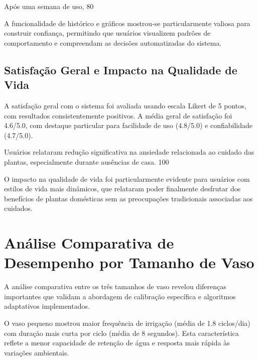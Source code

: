 \documentclass[twoside,english,brazilian]{UNISINOSmonografia}
\begin{document}
Após uma semana de uso, 80%

A funcionalidade de histórico e gráficos mostrou-se particularmente valiosa para construir confiança, permitindo que usuários visualizem padrões de comportamento e compreendam as decisões automatizadas do sistema.


\subsection{Satisfação Geral e Impacto na Qualidade de Vida}

A satisfação geral com o sistema foi avaliada usando escala Likert de 5 pontos, com resultados consistentemente positivos. A média geral de satisfação foi 4.6/5.0, com destaque particular para facilidade de uso (4.8/5.0) e confiabilidade (4.7/5.0).

Usuários relataram redução significativa na ansiedade relacionada ao cuidado das plantas, especialmente durante ausências de casa. 100%

O impacto na qualidade de vida foi particularmente evidente para usuários com estilos de vida mais dinâmicos, que relataram poder finalmente desfrutar dos benefícios de plantas domésticas sem as preocupações tradicionais associadas aos cuidados.

\section{Análise Comparativa de Desempenho por Tamanho de Vaso}

A análise comparativa entre os três tamanhos de vaso revelou diferenças importantes que validam a abordagem de calibração específica e algoritmos adaptativos implementados.

O vaso pequeno mostrou maior frequência de irrigação (média de 1.8 ciclos/dia) com duração mais curta por ciclo (média de 8 segundos). Esta característica reflete a menor capacidade de retenção de água e resposta mais rápida às variações ambientais.
\end{document}
